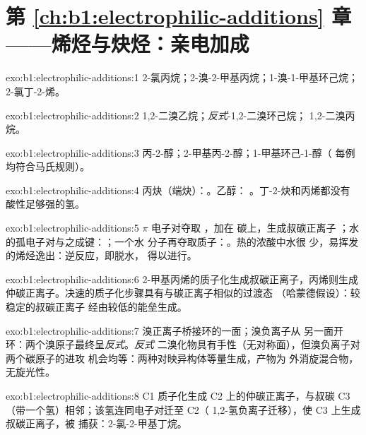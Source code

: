 \section*{第 \ref{ch:b1:electrophilic-additions} 章——烯烃与炔烃：亲电加成}

\begin{solution}{exo:b1:electrophilic-additions:1}
2-氯丙烷；2-溴-2-甲基丙烷；1-溴-1-甲基环己烷；
2-氯丁-2-烯。
\end{solution}

\begin{solution}{exo:b1:electrophilic-additions:2}
1,2-二溴乙烷；\textit{反式}-1,2-二溴环己烷；
1,2-二溴丙烷。
\end{solution}

\begin{solution}{exo:b1:electrophilic-additions:3}
丙-2-醇；2-甲基丙-2-醇；1-甲基环己-1-醇（
每例均符合马氏规则）。
\end{solution}

\begin{solution}{exo:b1:electrophilic-additions:4}
丙炔（端炔）：。乙醇：
。丁-2-炔和丙烯都没有
酸性足够强的氢。
\end{solution}

\begin{solution}{exo:b1:electrophilic-additions:5}
$\pi$ 电子对夺取 ，加在  碳上，生成叔碳正离子
；水的孤电子对与之成键：；一个水
分子再夺取质子：。热的浓酸中水很
少，易挥发的烯烃逸出：逆反应，即脱水，
得以进行。
\end{solution}

\begin{solution}{exo:b1:electrophilic-additions:6}
2-甲基丙烯的质子化生成叔碳正离子，丙烯则生成
仲碳正离子。决速的质子化步骤具有与碳正离子相似的过渡态
（哈蒙德假设）：较稳定的叔碳正离子
经由较低的能垒生成。
\end{solution}

\begin{solution}{exo:b1:electrophilic-additions:7}
溴正离子桥接环的一面；溴负离子从
另一面开环：两个溴原子最终呈\textit{反式}。\textit{反式}
二溴化物具有手性（无对称面），但溴负离子对两个碳原子的进攻
机会均等：两种对映异构体等量生成，产物为
外消旋混合物，无旋光性。
\end{solution}

\begin{solution}{exo:b1:electrophilic-additions:8}
C1 质子化生成 C2 上的仲碳正离子，与叔碳
C3（带一个氢）相邻；该氢连同电子对迁至 C2（
1,2-氢负离子迁移），使 C3 上生成叔碳正离子，被
 捕获：2-氯-2-甲基丁烷。
\end{solution}

